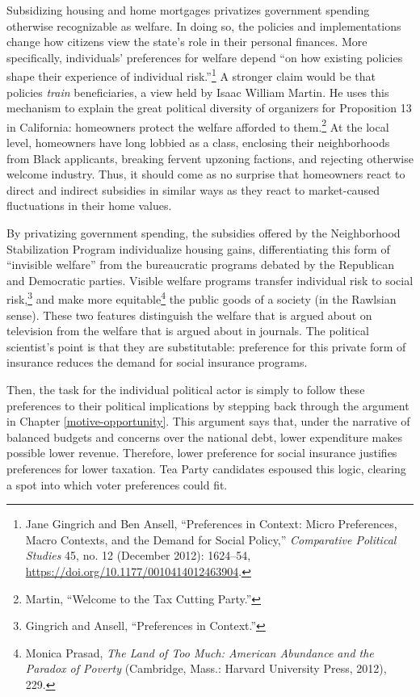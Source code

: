 \documentclass[12pt,oneside]{psthesis}
\begin{document}
Subsidizing housing and home mortgages privatizes government spending otherwise recognizable as welfare.
In doing so, the policies and implementations change how citizens view the state's role in their personal finances.
More specifically, individuals' preferences for welfare depend ``on how existing policies shape their experience of individual risk.''\footnote{Jane Gingrich and Ben Ansell, ``Preferences in Context: Micro Preferences, Macro Contexts, and the Demand for Social Policy,'' \emph{Comparative Political Studies} 45, no. 12 (December 2012): 1624--54, \url{https://doi.org/10.1177/0010414012463904}.}
A stronger claim would be that policies \emph{train} beneficiaries, a view held by Isaac William Martin.
He uses this mechanism to explain the great political diversity of organizers for Proposition 13 in California: homeowners protect the welfare afforded to them.\footnote{Martin, ``Welcome to the Tax Cutting Party.''}
At the local level, homeowners have long lobbied as a class, enclosing their neighborhoods from Black applicants, breaking fervent upzoning factions, and rejecting otherwise welcome industry.
Thus, it should come as no surprise that homeowners react to direct and indirect subsidies in similar ways as they react to market-caused fluctuations in their home values.

By privatizing government spending, the subsidies offered by the Neighborhood Stabilization Program individualize housing gains, differentiating this form of ``invisible welfare'' from the bureaucratic programs debated by the Republican and Democratic parties.
Visible welfare programs transfer individual risk to social risk,\footnote{Gingrich and Ansell, ``Preferences in Context.''} and make more equitable\footnote{Monica Prasad, \emph{The Land of Too Much: American Abundance and the Paradox of Poverty} (Cambridge, Mass.: Harvard University Press, 2012), 229.} the public goods of a society (in the Rawlsian sense).
These two features distinguish the welfare that is argued about on television from the welfare that is argued about in journals.
The political scientist's point is that they are substitutable: preference for this private form of insurance reduces the demand for social insurance programs.

Then, the task for the individual political actor is simply to follow these preferences to their political implications by stepping back through the argument in Chapter \ref{motive-opportunity}.
This argument says that, under the narrative of balanced budgets and concerns over the national debt, lower expenditure makes possible lower revenue.
Therefore, lower preference for social insurance justifies preferences for lower taxation.
Tea Party candidates espoused this logic, clearing a spot into which voter preferences could fit.
\end{document}
